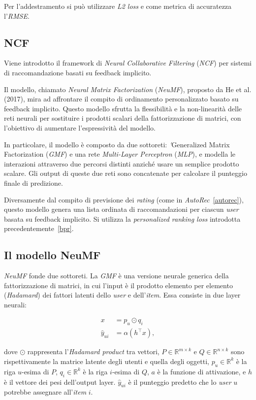 Per l'addestramento si può utilizzare \textit{L2 loss} e come metrica di accuratezza l'\textit{RMSE}.

\subsection{NCF}
Viene introdotto il framework di \textit{Neural Collaborative Filtering} (\textit{NCF}) per sistemi di raccomandazione basati su feedback implicito.

Il modello, chiamato \textit{Neural Matrix Factorization} (\textit{NeuMF}), proposto da He et al. (2017), mira ad affrontare il compito di ordinamento personalizzato basato su feedback implicito. Questo modello sfrutta la flessibilità e la non-linearità delle reti neurali per sostituire i prodotti scalari della fattorizzazione di matrici, con l'obiettivo di aumentare l'espressività del modello.

In particolare, il modello è composto da due sottoreti: \textit'{Generalized Matrix Factorization} (\textit{GMF}) e una rete \textit{Multi-Layer Perceptron} (\textit{MLP}), e modella le interazioni attraverso due percorsi distinti anziché usare un semplice prodotto scalare. Gli output di queste due reti sono concatenate per calcolare il punteggio finale di predizione.

Diversamente dal compito di previsione dei \textit{rating} (come in \textit{AutoRec}~\ref{autorec}), questo modello genera una lista ordinata di raccomandazioni per ciascun \textit{user} basata su feedback implicito. Si utilizza la \textit{personalized ranking loss} introdotta precedentemente~\ref{bpr}.

\subsection{Il modello NeuMF}

\textit{NeuMF} fonde due sottoreti. La \textit{GMF} è una versione neurale generica della fattorizzazione di matrici, in cui l'input è il prodotto elemento per elemento (\textit{Hadamard}) dei fattori latenti dello \textit{user} e dell'\textit{item}. Essa consiste in due layer neurali:

\[
\begin{split}
x &= p_u \odot q_i \\
\hat{y}_{ui} &= \alpha(h^\top x),
\end{split}
\]

dove $\odot$ rappresenta l'\textit{Hadamard product} tra vettori, $P \in \mathbb{R}^{m \times k}$ e $Q \in \mathbb{R}^{n \times k}$ sono rispettivamente la matrice latente degli utenti e quella degli oggetti, $p_u \in \mathbb{R}^{k}$ è la riga $u$-esima di $P$, $q_i \in \mathbb{R}^{ k}$ è la riga $i$-esima di $Q$, $a$ è la funzione di attivazione, e $h$ è il vettore dei pesi dell'output layer.  
$\hat{y}_{ui}$ è il punteggio predetto che lo \textit{user} $u$ potrebbe assegnare all'\textit{item} $i$.

